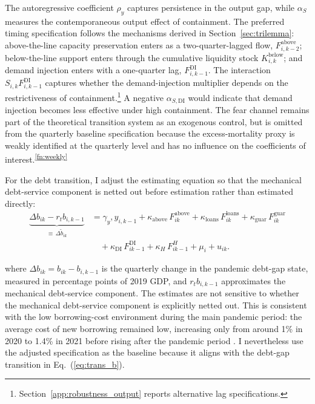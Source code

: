 \documentclass[12pt, a4paper]{article}
\begin{document}
The autoregressive coefficient $\rho_y$ captures persistence in the output gap, while $\alpha_S$ measures the contemporaneous output effect of containment. The preferred timing specification follows the mechanisms derived in Section~\ref{sec:trilemma}: above-the-line capacity preservation enters as a two-quarter-lagged flow, $F^{\text{above}}_{i,k-2}$; below-the-line support enters through the cumulative liquidity stock $K^{\text{below}}_{i,k}$; and demand injection enters with a one-quarter lag, $F^{\text{DI}}_{i,k-1}$. The
interaction $S_{i,k} F^{\text{DI}}_{i,k-1}$ captures whether the demand-injection multiplier depends on the restrictiveness of containment.\footnote{Section~\ref{app:robustness_output} reports alternative lag
specifications.} A negative $\alpha_{S,\text{DI}}$ would indicate that demand injection becomes less effective under high containment. The fear channel remains part of the theoretical transition system as an exogenous control, but is omitted from the quarterly baseline specification because the excess-mortality proxy is weakly identified at the quarterly level and has no influence on the coefficients of interest.\textsuperscript{\ref{fn:weekly}}



For the debt transition, I adjust the estimating equation so that the mechanical debt-service component is netted out before estimation rather than estimated directly:
%
\begin{equation}
\begin{aligned}
    \underbrace{\Delta b_{ik} - r_t b_{i,k-1}}_{\equiv\, \Delta \tilde b_{ik}}
    &= \gamma_y, y_{i,k-1}
    + \kappa_{\text{above}}\, F_{ik}^{\text{above}}
    + \kappa_{\text{loans}}\, F_{ik}^{\text{loans}}
    + \kappa_{\text{guar}}\, F_{ik}^{\text{guar}} \\
    &\quad
    + \kappa_{\text{DI}}\, F_{ik-1}^{\text{DI}}
    + \kappa_H\, F_{ik-1}^{H}
    + \mu_i + u_{ik}.
\end{aligned}
\label{eq:debt_est}
\end{equation}
%

\noindent where $\Delta b_{ik}=b_{ik}-b_{i,k-1}$ is the quarterly change in the pandemic debt-gap state, measured in percentage points of 2019 GDP, and $r_t b_{i,k-1}$ approximates the mechanical debt-service component. The estimates are not sensitive to whether the mechanical debt-service component is explicitly netted out. This is consistent with the low borrowing-cost environment during the main pandemic period: the average cost of new borrowing remained low, increasing only from around 1\% in 2020 to 1.4\% in 2021 before rising after the pandemic period \citep{oecd2021borrowing,oecd2023borrowing}. I nevertheless use the adjusted specification as the baseline because it aligns with the debt-gap transition in Eq.~(\ref{eq:trans_b}).
\end{document}
